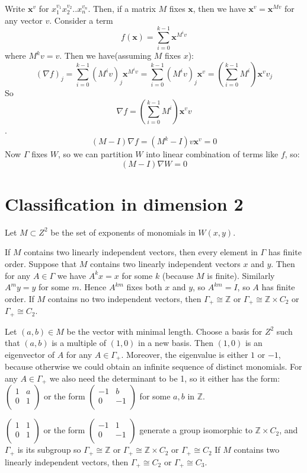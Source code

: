 \documentclass[a4paper]{article}
\begin{document}
	Write $\textbf{x}^v$ for $x_1^{v_1} x_2^{v_2} .. x_n^{v_n}$. Then, if a matrix $M$ fixes $\textbf{x}$, then we have $\textbf{x}^v = \textbf{x}^{Mv}$ for any vector $v$.
	Consider a term 
	$$f(\textbf{x}) = \sum_{i=0}^{k-1} \textbf{x}^{M^i v}$$
	where $M^k v =v$.
	Then we have(assuming $M$ fixes $x$):
	$$(\nabla f)_j = \sum_{i=0}^{k-1} (M^i v)_j \textbf{x}^{M^i v} = \sum_{i=0}^{k-1} (M^i v)_j \textbf{x}^{v} = (\sum_{i=0}^{k-1} M^i) \textbf{x}^{v} v_j$$
	So $$\nabla f = (\sum_{i=0}^{k-1} M^i) \textbf{x}^{v} v$$.
	$$(M-I)\nabla f= (M^k-I)v \textbf{x}^{v}= 0$$
	Now $\Gamma$ fixes $W$, so we can partition $W$ into linear combination of terms like $f$, so:
	$$(M-I)\nabla W = 0$$
    \section{Classification in dimension 2}
    	Let $M \subset Z^2$ be the set of exponents of monomials in $W(x,y)$.
    
    \clm If $M$ contains two linearly independent vectors, then every element in $\Gamma$ has finite order.
    Suppose that $M$ contains two linearly independent vectors $x$ and $y$. Then for any $A \in \Gamma$ we have $A^k x= x$ for some $k$ (because $M$ is finite). Similarly $A^m y = y$ for some $m$. Hence $A^{k m}$ fixes both $x$ and $y$, so $A^{k m} = I$, so $A$ has finite order.
    \clm If $M$ contains no two independent vectors, then $\Gamma_+ \cong \mathbb{Z}$ or $\Gamma_+ \cong \mathbb{Z} \times C_{2}$ or $\Gamma_+ \cong C_{2}$.
    
    Let $(a,b) \in M$ be the vector with minimal length.
    Choose a basis for $Z^2$ such that $(a,b)$ is a multiple of $(1,0)$ in a new basis. Then $(1,0)$ is an eigenvector of $A$ for any $A \in \Gamma_+$. Moreover, the eigenvalue is either $1$ or $-1$, because otherwise we could obtain an infinite sequence of distinct monomials. For any $A \in \Gamma_+$ we also need the determinant to be 1, so it either has the form:
    $\begin{pmatrix}
    1 & a \\
    0 & 1 \\
    \end{pmatrix}$ or the form 
    $\begin{pmatrix}
    -1 & b \\
    0 & -1 \\
    \end{pmatrix}$
    for some $a, b$ in $\mathbb{Z}$.
    
    $\begin{pmatrix}
    1 & 1 \\ 
    0 & 1 \\
    \end{pmatrix}$ or the form 
    $\begin{pmatrix}
    -1 & 1 \\
    0 & -1 \\
    \end{pmatrix}$ generate a group isomorphic to $\mathbb{Z} \times C_2$, and $\Gamma_+$ is its subgroup so $\Gamma_+ \cong \mathbb{Z}$ or $\Gamma_+ \cong \mathbb{Z} \times C_2$ or $\Gamma_+ \cong C_2$
    \clm If $M$ contains two linearly independent vectors, then $\Gamma_+ \cong C_2$ or $\Gamma_+ \cong C_3$.
    
\end{document}
